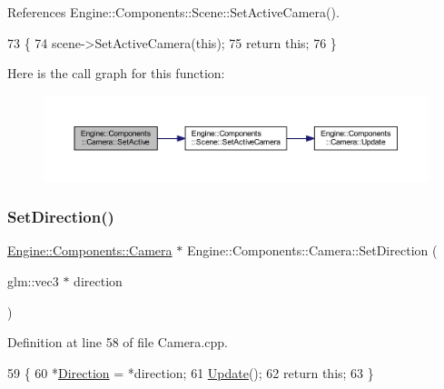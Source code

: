 References Engine\+::\+Components\+::\+Scene\+::\+Set\+Active\+Camera().


\begin{DoxyCode}
73 \{
74     scene->SetActiveCamera(\textcolor{keyword}{this});
75     \textcolor{keywordflow}{return} \textcolor{keyword}{this};
76 \}
\end{DoxyCode}
Here is the call graph for this function\+:
\nopagebreak
\begin{figure}[H]
\begin{center}
\leavevmode
\includegraphics[width=350pt]{classEngine_1_1Components_1_1Camera_af3ce56d4d1a66fa4e45ec8775e4149e7_cgraph}
\end{center}
\end{figure}
\mbox{\label{classEngine_1_1Components_1_1Camera_a7fdbe486e45390cbfc3961cb891440bd}} 
\subsubsection{\texorpdfstring{Set\+Direction()}{SetDirection()}}
{\footnotesize\ttfamily \mbox{\hyperlink{classEngine_1_1Components_1_1Camera}{Engine\+::\+Components\+::\+Camera}} $\ast$ Engine\+::\+Components\+::\+Camera\+::\+Set\+Direction (\begin{DoxyParamCaption}\item[{glm\+::vec3 $\ast$}]{direction }\end{DoxyParamCaption})}



Definition at line 58 of file Camera.\+cpp.


\begin{DoxyCode}
59 \{
60     *\mbox{\hyperlink{classEngine_1_1Components_1_1Camera_a23619a66046258f1158313f0c790ffa2}{Direction}} = *direction;
61     \mbox{\hyperlink{classEngine_1_1Components_1_1Camera_a364f5e22921e3d234b31297a64c7d932}{Update}}();
62     \textcolor{keywordflow}{return} \textcolor{keyword}{this};
63 \}
\end{DoxyCode}
\mbox{\label{classEngine_1_1Components_1_1Camera_ada6e11faa2124d571b7d125fc8a0c72e}} 
